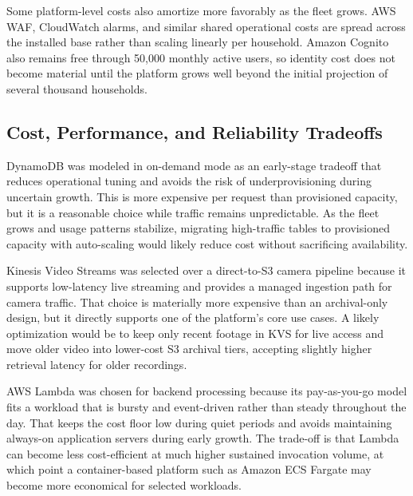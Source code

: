 Some platform-level costs also amortize more favorably as the fleet grows. AWS WAF, CloudWatch alarms, and similar shared operational costs are spread across the installed base rather than scaling linearly per household. Amazon Cognito also remains free through 50,000 monthly active users, so identity cost does not become material until the platform grows well beyond the initial projection of several thousand households.

\subsection{Cost, Performance, and Reliability Tradeoffs}

DynamoDB was modeled in on-demand mode as an early-stage tradeoff that reduces operational tuning and avoids the risk of underprovisioning during uncertain growth. This is more expensive per request than provisioned capacity, but it is a reasonable choice while traffic remains unpredictable. As the fleet grows and usage patterns stabilize, migrating high-traffic tables to provisioned capacity with auto-scaling would likely reduce cost without sacrificing availability.

Kinesis Video Streams was selected over a direct-to-S3 camera pipeline because it supports low-latency live streaming and provides a managed ingestion path for camera traffic. That choice is materially more expensive than an archival-only design, but it directly supports one of the platform's core use cases. A likely optimization would be to keep only recent footage in KVS for live access and move older video into lower-cost S3 archival tiers, accepting slightly higher retrieval latency for older recordings.

AWS Lambda was chosen for backend processing because its pay-as-you-go model fits a workload that is bursty and event-driven rather than steady throughout the day. That keeps the cost floor low during quiet periods and avoids maintaining always-on application servers during early growth. The trade-off is that Lambda can become less cost-efficient at much higher sustained invocation volume, at which point a container-based platform such as Amazon ECS Fargate may become more economical for selected workloads.